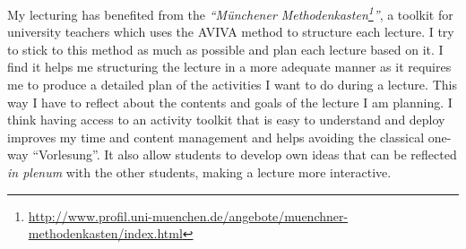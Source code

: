 \documentclass[a4paper,11pt]{article}
\begin{document}
My lecturing has benefited from the \emph{``M\"unchener Methodenkasten\footnote{\href{http://www.profil.uni-muenchen.de/angebote/muenchner-methodenkasten/index.html}{http://www.profil.uni-muenchen.de/angebote/muenchner-methodenkasten/index.html}}''}, a toolkit for university teachers which uses the AVIVA method to structure each lecture. I try to stick to this method as much as possible and plan each lecture based on it. I find it helps me structuring the lecture in a more adequate manner as it requires me to produce a detailed plan of the activities I want to do during a lecture. This way I have to reflect about the contents and goals of the lecture I am planning. I think having access to an activity toolkit that is easy to understand and deploy improves my time and content management and helps avoiding the classical one-way ``Vorlesung''. It also allow students to develop own ideas that can be reflected \emph{in plenum} with the other students, making a lecture more interactive.\\
\end{document}

